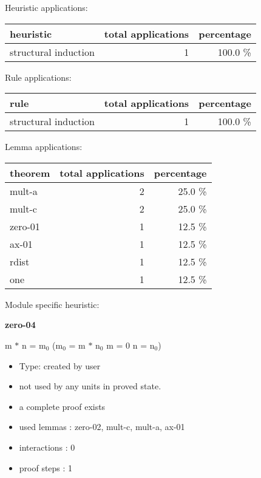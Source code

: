 \documentclass[a4paper]{article}
\begin{document}
\medskip


Heuristic applications:

\begin{supertabular}{l|r|r}
heuristic	& total applications & percentage \\ \hline
structural induction & 1 & 100.0 \% \\

\end{supertabular}

Rule applications:

\begin{supertabular}{l|r|r}
rule	        & total applications & percentage \\ \hline
structural induction & 1 & 100.0 \% \\

\end{supertabular}

Lemma applications:

\begin{supertabular}{l|r|r}
theorem	        & total applications & percentage \\ \hline
mult-a & 2 & 25.0 \% \\
mult-c & 2 & 25.0 \% \\
zero-01 & 1 & 12.5 \% \\
ax-01 & 1 & 12.5 \% \\
rdist & 1 & 12.5 \% \\
one & 1 & 12.5 \% \\

\end{supertabular}

Module specific heuristic:

\pagebreak

{\LARGE\bf zero-04}\label{lemma-zero-04}

\medskip

 \Fol m $*$ n = $\mbox{m}_{0}$ \Imp ($\mbox{m}_{0}$ = m $*$ $\mbox{n}_{0}$ \Equiv m = 0 \Or n = $\mbox{n}_{0}$)

\begin{itemize}

\item Type: created by user

\item not used by any units in proved state.
\item       a complete proof exists
\item       used lemmas  : zero-02, mult-c, mult-a, ax-01
\item       interactions : 0
\item       proof steps  : 1
\end{itemize}
\end{document}
